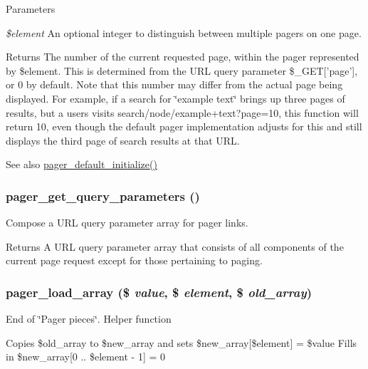 \begin{DoxyParams}{Parameters}
\item[{\em \$element}]An optional integer to distinguish between multiple pagers on one page.\end{DoxyParams}
\begin{DoxyReturn}{Returns}
The number of the current requested page, within the pager represented by \$element. This is determined from the URL query parameter \$\_\-GET\mbox{[}'page'\mbox{]}, or 0 by default. Note that this number may differ from the actual page being displayed. For example, if a search for \char`\"{}example text\char`\"{} brings up three pages of results, but a users visits search/node/example+text?page=10, this function will return 10, even though the default pager implementation adjusts for this and still displays the third page of search results at that URL.
\end{DoxyReturn}
\begin{DoxySeeAlso}{See also}
\hyperlink{pager_8inc_a8e8fe141a61ed070df4145bee4ec5571}{pager\_\-default\_\-initialize()} 
\end{DoxySeeAlso}
\hypertarget{pager_8inc_a72b73df2a968faea00b27cdae0c8ee87}{
\subsubsection[{pager\_\-get\_\-query\_\-parameters}]{\setlength{\rightskip}{0pt plus 5cm}pager\_\-get\_\-query\_\-parameters ()}}
\label{pager_8inc_a72b73df2a968faea00b27cdae0c8ee87}
Compose a URL query parameter array for pager links.

\begin{DoxyReturn}{Returns}
A URL query parameter array that consists of all components of the current page request except for those pertaining to paging. 
\end{DoxyReturn}
\hypertarget{pager_8inc_a0f82d7cb1702f6d160285903378a9919}{
\subsubsection[{pager\_\-load\_\-array}]{\setlength{\rightskip}{0pt plus 5cm}pager\_\-load\_\-array (\$ {\em value}, \/  \$ {\em element}, \/  \$ {\em old\_\-array})}}
\label{pager_8inc_a0f82d7cb1702f6d160285903378a9919}
End of \char`\"{}Pager pieces\char`\"{}. Helper function

Copies \$old\_\-array to \$new\_\-array and sets \$new\_\-array\mbox{[}\$element\mbox{]} = \$value Fills in \$new\_\-array\mbox{[}0 .. \$element -\/ 1\mbox{]} = 0 